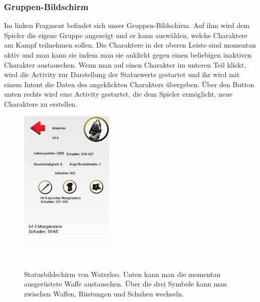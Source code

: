 \documentclass[extern,palatino]{cgBA}
\begin{document}
\subsubsection{Gruppen-Bildschirm}
Im linken Fragment befindet sich unser Gruppen-Bildschirm. Auf ihm wird dem Spieler die eigene Gruppe angezeigt und er kann auswählen, welche Charaktere am Kampf teilnehmen sollen. Die Charaktere in der oberen Leiste sind momentan aktiv und man kann sie indem man sie anklickt gegen einen beliebigen inaktiven Charakter austauschen.
Wenn man auf einen Charakter im unteren Teil klickt, wird die Activity zur Darstellung der Statuswerte gestartet und ihr wird mit einem Intent die Daten des angeklickten Charakters übergeben. Über den Button unten rechts wird eine Activity gestartet, die dem Spieler ermöglicht, neue Charaktere zu erstellen.
\newpage
\begin{figure}[htb] 
	\centering
	\includegraphics[width=0.4\textwidth]{statscreen.png}
	\caption{Statusbildschirm von Waterloo. Unten kann man die momentan ausgerüstete Waffe austauschen. Über die drei Symbole kann man zwischen Waffen, Rüstungen und Schuhen wechseln.}
	\label{fig:Bild4}
\end{figure} 
\end{document}
